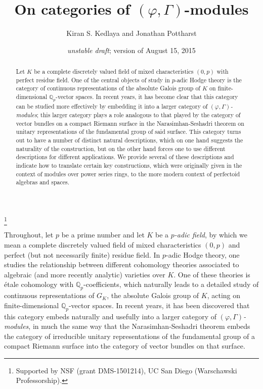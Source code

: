 \documentclass[12pt]{amsart}
\theoremstyle{definition}
\numberwithin{equation}{theorem}
\newcommand{\QQ}{\mathbb{Q}}
\begin{document}
\title{On categories of $(\varphi, \Gamma)$-modules}
\author{Kiran S. Kedlaya and Jonathan Pottharst}
\thanks{Supported by NSF (grant DMS-1501214), UC San Diego (Warschawski Professorship).}
\date{\textit{unstable draft}; version of August 15, 2015}

\begin{abstract}
Let $K$ be a complete discretely valued field of mixed characteristics $(0,p)$ with perfect residue field. One of the central objects of study in $p$-adic Hodge theory is the cate\-gory of continuous representations of the absolute Galois group of $K$ on finite-dimensional $\QQ_p$-vector spaces. In recent years, it has become clear that this category can be studied more effectively by embedding it into a larger category of \emph{$(\varphi, \Gamma)$-modules}; this larger category plays a role analogous to that played by the category of vector bundles on a compact Riemann surface in the Narasimhan-Seshadri theorem on unitary representations of the fundamental group of said surface. This category turns out to have a number of distinct natural descriptions, which on one hand suggests the naturality of the construction, but on the other hand forces one to use different descriptions for different applications. We provide several of these descriptions and indicate how to translate certain key constructions, which were originally given in the context of modules over power series rings, to the more modern context of perfectoid algebras and spaces.
\end{abstract}

\maketitle

Throughout, let $p$ be a prime number and let $K$ be a \emph{$p$-adic field}, by which we mean a complete discretely valued field of mixed characteristics $(0,p)$ and perfect (but not necessarily finite) residue field. In $p$-adic Hodge theory, one studies the relationship between different cohomology theories associated to algebraic (and more recently analytic) varieties over $K$. One of these theories is \'etale cohomology with $\QQ_p$-coefficients, which naturally leads to a detailed study of continuous representations of $G_K$, the absolute Galois group of $K$, acting on finite-dimensional $\QQ_p$-vector spaces. In recent years, it has been discovered that this category embeds naturally and usefully into a larger category of \emph{$(\varphi, \Gamma)$-modules}, in much the same way that the Narasimhan-Seshadri theorem embeds the category of irreducible unitary representations of the fundamental group of a compact Riemann surface into the category of vector bundles on that surface.
\end{document}
